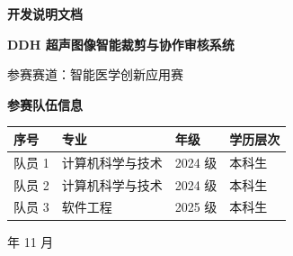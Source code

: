 \documentclass[UTF8,a4paper,10pt]{ctexart}
\begin{document}
\thispagestyle{plain}
\begin{center}
\vspace*{0.10cm}
{\sffamily\bfseries\fontsize{27}{32}\selectfont\color{navy} 开发说明文档}

\vspace{0.40cm}
{\sffamily\bfseries\fontsize{15}{20}\selectfont DDH 超声图像智能裁剪与协作审核系统}

\vspace{0.24cm}
{\sffamily\fontsize{10.5}{14}\selectfont\color{gray!55!black} 参赛赛道：智能医学创新应用赛}

\vspace{0.58cm}
{\sffamily\bfseries\fontsize{11}{14}\selectfont 参赛队伍信息}

\vspace{0.20cm}
{\renewcommand{\arraystretch}{1.30}\small
\begin{tabular}{|C{2.2cm}|C{5.6cm}|C{2.2cm}|C{2.4cm}|}
\hline
{}\bfseries 序号 & \bfseries 专业 & \bfseries 年级 & \bfseries 学历层次 \\
\hline
队员 1 & 计算机科学与技术 & 2024 级 & 本科生 \\
\hline
队员 2 & 计算机科学与技术 & 2024 级 & 本科生 \\
\hline
队员 3 & 软件工程 & 2025 级 & 本科生 \\
\hline
\end{tabular}}

\vspace{0.26cm}
{\sffamily\fontsize{10.5}{14} 年 11 月}
\end{center}

\vspace{0.24cm}
\noindent\makebox[\textwidth][c]{\color{decob}\rule{\textwidth}{0.6pt}}
\vspace{0.10cm}
\end{document}
